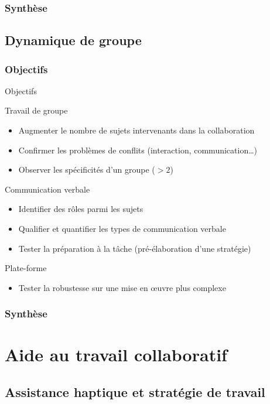 \documentclass[english,french,dvips]{mybeamer}
\begin{document}
	\subsubsection{Synthèse}
	\subsection{Dynamique de groupe}
	\subsubsection{Objectifs}
	\begin{frame}{Objectifs}
		\begin{block}{Travail de groupe}
			\begin{itemize}
				\item Augmenter le nombre de sujets intervenants dans la collaboration
				\item Confirmer les problèmes de conflits (interaction, communication\dots{})
				\item Observer les spécificités d'un groupe ($>2$)
			\end{itemize}
		\end{block}
		\begin{block}{Communication verbale}
			\begin{itemize}
				\item Identifier des rôles parmi les sujets
				\item Qualifier et quantifier les types de communication verbale
				\item Tester la préparation à la tâche (pré-élaboration d'une stratégie)
			\end{itemize}
		\end{block}
		\begin{block}{Plate-forme}
			\begin{itemize}
				\item Tester la robustesse sur une mise en œuvre plus complexe
			\end{itemize}
		\end{block}
	\end{frame}
	\subsubsection{Synthèse}
	\section{Aide au travail collaboratif}
	\subsection{Assistance haptique et stratégie de travail}
\end{document}
